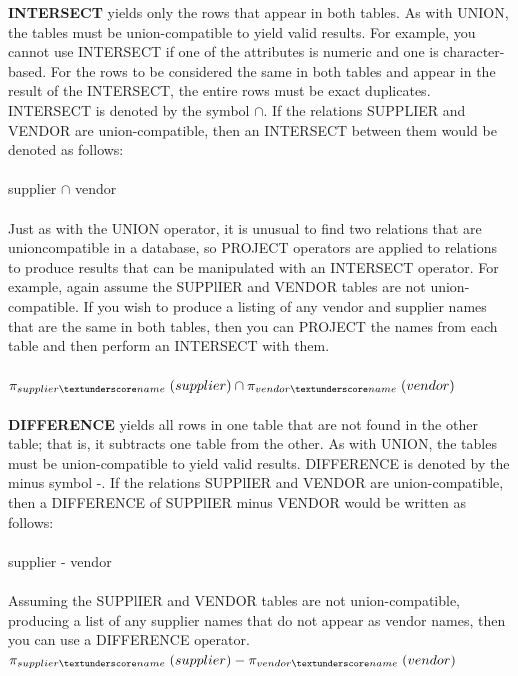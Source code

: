 \documentclass[a4paper, 12pt, titlepage]{report}
\begin{document}
{\textbf{INTERSECT} yields only the rows that appear in both tables. As with UNION, the tables must be union-compatible to yield valid results. For example, you cannot use INTERSECT if one of the attributes is numeric and one is character-based. For the rows
to be considered the same in both tables and appear in the result of the INTERSECT, the entire rows must be exact duplicates. INTERSECT is denoted by the symbol $\cap$. If the relations SUPPLIER and VENDOR are union-compatible, then an INTERSECT between them would be denoted as follows:\\ \\
supplier $\cap$ vendor\\ \\
Just as with the UNION operator, it is unusual to find two relations that are unioncompatible in a database, so PROJECT operators are applied to relations to produce results that can be manipulated with an INTERSECT operator. For example, again assume the
SUPPlIER and VENDOR tables are not union-compatible. If you wish to produce a listing of any vendor and supplier names that are the same in both tables, then you can PROJECT the names from each table and then perform an INTERSECT with them.\\ \\
$\pi_{supplier\textunderscore name} \hspace{0.1cm} (supplier) \cap \pi_{vendor\textunderscore name \hspace{0.1cm}} (vendor)$\\ \\
\textbf{DIFFERENCE} yields all rows in one table that are not found in the other table; that is, it subtracts one table from the other. As with UNION, the tables must be union-compatible to yield valid results. DIFFERENCE is denoted by the minus symbol -. If the relations SUPPlIER and VENDOR are union-compatible, then a DIFFERENCE of SUPPlIER minus VENDOR would be written as follows:\\ \\
supplier - vendor\\ \\
Assuming the SUPPlIER and VENDOR tables are not union-compatible, producing a list of any supplier names that do not appear as vendor names, then you can use a DIFFERENCE operator.
$\pi_{supplier\textunderscore name} \hspace{0.1cm} (supplier) - \pi_{vendor\textunderscore name} \hspace{0.1cm} (vendor)$\\ \\
}
\end{document}
